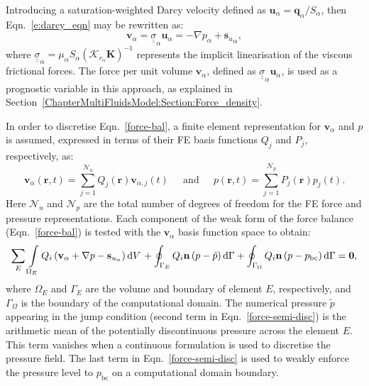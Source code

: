 Introducing a saturation-weighted Darcy velocity defined as $\mathbf{u}_\alpha= \mathbf{q}_\alpha/S_\alpha$, then Eqn.~\ref{e:darcy_eqn} may be rewritten as:
\begin{equation}
  \mathbf{v}_\alpha={\underline {\underline \sigma}}_{\alpha} \mathbf{u}_{\alpha} = - \nabla p_{\alpha} + {\mathbf{s}_{u}}_{\alpha},
  \label{force-bal}
\end{equation}
where ${\underline {\underline \sigma}}_{\alpha}=\mu_\alpha S_\alpha \left(\mathcal{K}_{{r}_\alpha}\mathbf{K}\right)^{-1}$ represents the implicit linearisation of the viscous frictional forces. The force per unit volume $\mathbf{v}_\alpha$, defined as ${\underline {\underline \sigma}}_{\alpha} \mathbf{u}_\alpha$, is used as a prognostic variable in this approach, as explained in Section~\ref{ChapterMultiFluidsModel:Section:Force_density}.

In order to discretise Eqn.~\ref{force-bal}, a finite element representation for $\mathbf{v}_\alpha$ and $p$ is assumed, expressed in terms of their FE basis functions $Q_{j}$ and $P_{j}$, respectively, as:
\begin{equation}
  \mathbf{v}_\alpha(\bm{r},t) = \sum\limits_{j=1}^{\mathcal{N}_u} Q_{j}(\bm{r})\mathbf{v}_{\alpha,j}(t) \;\;\;\;\text{ and } \;\;\;\; p(\bm{r},t) = \sum\limits_{j=1}^{\mathcal{N}_p} P_{j}(\bm{r})p_{j}(t).
\end{equation} 
Here $\mathcal{N}_{u}$ and $\mathcal{N}_{p}$ are the total number of degrees of freedom for the FE force and pressure representations. Each component of the weak form of the force balance (Eqn.~\ref{force-bal}) is tested with the $\mathbf{v}_\alpha$ basis function space to obtain:
\begin{displaymath}
  \sum\limits_{E} \left. \int\limits_{\Omega_E} { {Q}}_i \left({\mathbf v}_\alpha + \nabla p  -{\mathbf s}_{u_\alpha}\right) \mathrm{d} V \right. + \displaystyle \oint_{\Gamma_{E}} {Q}_i {\mathbf n} \left(p - \tilde{p}\right) \mathrm{d}\Gamma + \oint_{\Gamma_{\Omega}} {Q}_i {\mathbf n} \left(p - p_\text{bc}\right) \mathrm{d}\Gamma = \bm{0},\nonumber \label{force-semi-disc} 
\end{displaymath} 
where $\Omega_E$ and $\Gamma_{E}$ are the volume and boundary of element $E$, respectively, and $\Gamma_{\Omega}$ is the boundary of the computational domain. The numerical pressure $\tilde{p}$ appearing in the jump condition (second term in Eqn.~\ref{force-semi-disc}) is the arithmetic mean of the potentially discontinuous pressure across the element $E$. This term vanishes when a continuous formulation is used to discretise the pressure field. The last term in Eqn.~\ref{force-semi-disc} is used to weakly enforce the pressure level to $p_\text{bc}$ on a computational domain boundary.

